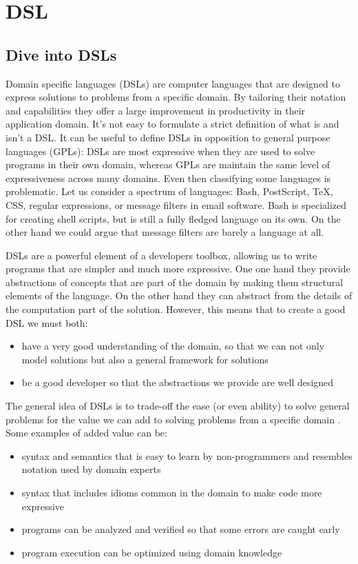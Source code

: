 \chapter{DSL}

\section{Dive into DSLs}

Domain specific languages (DSLs) are computer languages that are designed to express solutions to problems from a specific domain. By tailoring their notation and capabilities they offer a large improvement in productivity in their application domain. It's not easy to formulate a strict definition of what is and isn't a DSL. It can be useful to define DSLs in opposition to general purpose languages (GPLs): DSLs are most expressive when they are used to solve programs in their own domain, whereas GPLs are maintain the same level of expressiveness across many domains. Even then classifying some languages is problematic. Let us consider a spectrum of languages: Bash, PostScript, TeX, CSS, regular expressions, or message filters in email software. Bash is specialized for creating shell scripts, but is still a fully fledged language on its own. On the other hand we could argue that message filters are barely a language at all.

DSLs are a powerful element of a developers toolbox, allowing us to write programs that are simpler and much more expressive. One one hand they provide abstractions of concepts that are part of the domain by making them structural elements of the language. On the other hand they can abstract from the details of the computation part of the solution. However, this means that to create a good DSL we must both: 
\begin{itemize}
	\item have a very good understanding of the domain, so that we can not only model solutions but also a general framework for solutions
	\item be a good developer so that the abstractions we provide are well designed
\end{itemize} 

The general idea of DSLs is to trade-off the ease (or even ability) to solve general problems for the value we can add to solving problems from a specific domain \autocite{Mernik:2005}. Some examples of added value can be:
\begin{itemize}
	\item syntax and semantics that is easy to learn by non-programmers and resembles notation used by domain experts
	\item syntax that includes idioms common in the domain to make code more expressive
	\item programs can be analyzed and verified so that some errors are caught early
	\item program execution can be optimized using domain knowledge
\end{itemize}


